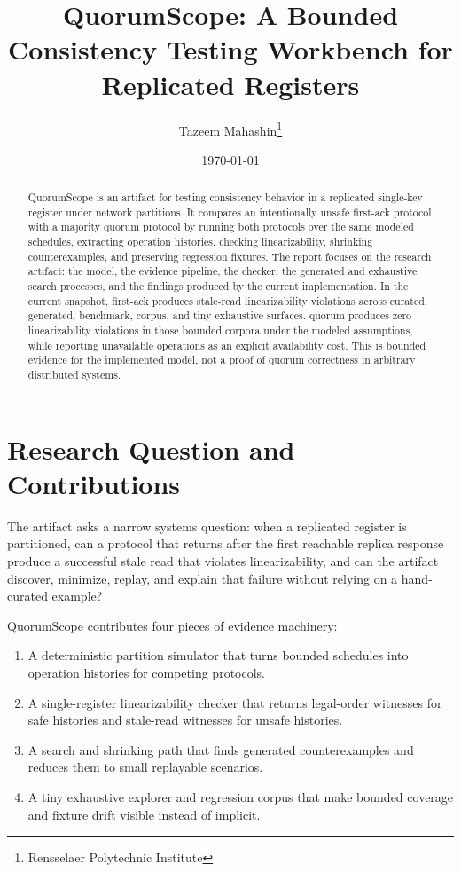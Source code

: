 \documentclass[10pt]{article}
\title{QuorumScope: A Bounded Consistency Testing Workbench for Replicated Registers}
\author{Tazeem Mahashin\thanks{Rensselaer Polytechnic Institute}}
\date{\today}
\newcommand{\qs}{QuorumScope}
\newcommand{\firstack}{first-ack}
\newcommand{\quorum}{quorum}
\begin{document}
\renewcommand{\thefootnote}{\fnsymbol{footnote}}
\maketitle
\setcounter{footnote}{0}
\renewcommand{\thefootnote}{\arabic{footnote}}

\begin{abstract}
\qs{} is an artifact for testing consistency behavior in a replicated single-key register under
network partitions. It compares an intentionally unsafe \firstack{} protocol with a majority
\quorum{} protocol by running both protocols over the same modeled schedules, extracting
operation histories, checking linearizability, shrinking counterexamples, and preserving
regression fixtures. The report focuses on the research artifact: the model, the evidence
pipeline, the checker, the generated and exhaustive search processes, and the findings produced
by the current implementation. In the current snapshot, \firstack{} produces stale-read
linearizability violations across curated, generated, benchmark, corpus, and tiny exhaustive
surfaces. \quorum{} produces zero linearizability violations in those bounded corpora under the
modeled assumptions, while reporting unavailable operations as an explicit availability cost.
This is bounded evidence for the implemented model, not a proof of quorum correctness in
arbitrary distributed systems.
\end{abstract}

\section{Research Question and Contributions}

The artifact asks a narrow systems question: when a replicated register is partitioned, can a
protocol that returns after the first reachable replica response produce a successful stale read
that violates linearizability, and can the artifact discover, minimize, replay, and explain that
failure without relying on a hand-curated example?

\qs{} contributes four pieces of evidence machinery:

\begin{enumerate}
  \item A deterministic partition simulator that turns bounded schedules into operation histories
  for competing protocols.
  \item A single-register linearizability checker that returns legal-order witnesses for safe
  histories and stale-read witnesses for unsafe histories.
  \item A search and shrinking path that finds generated counterexamples and reduces them to
  small replayable scenarios.
  \item A tiny exhaustive explorer and regression corpus that make bounded coverage and fixture
  drift visible instead of implicit.
\end{enumerate}
\end{document}
